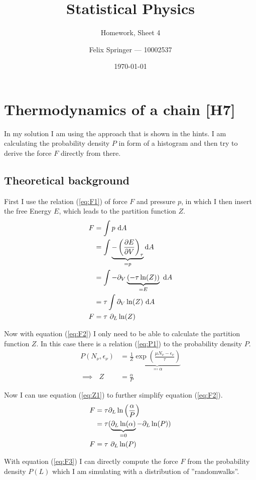 \documentclass[a4paper,12pt]{scrartcl}
\title{Statistical Physics}
\subtitle{Homework, Sheet 4}
\author{Felix Springer --- 10002537}
\date{\today}
\begin{document}
\maketitle

\section{Thermodynamics of a chain [H7]}
In my solution I am using the approach that is shown in the hints.
I am calculating the probability density $P$ in form of a histogram and then try to derive the force $F$ directly from there.

\subsection{Theoretical background}
First I use the relation (\ref{eq:F1}) of force $F$ and pressure $p$, in which I then insert the free Energy $E$, which leads to the partition function $Z$.
\begin{align}
	F &= \int p \text{ d}A \label{eq:F1} \\
	&= \int \underbrace{- \left( \frac{\partial E}{\partial V} \right)_{\tau}}_{= p} \text{d}A \notag \\
	&= \int - \partial_V \underbrace{(- \tau \ln(Z))}_{= E} \text{ d}A \notag \\
	&= \tau \int \partial_V \ln(Z) \text{ d}A \notag \\
	F &= \tau \text{ } \partial_L \ln(Z) \label{eq:F2}
\end{align}

Now with equation (\ref{eq:F2}) I only need to be able to calculate the partition function $Z$.
In this case there is a relation (\ref{eq:P1}) to the probability density $P$.
\begin{align}
	P (N_\nu, \epsilon_\nu) &= \frac{1}{Z} \underbrace{\exp \left( {\frac{\mu N_\nu - \epsilon_\nu}{\tau}} \right)}_{\eqqcolon \alpha} \label{eq:P1} \\
	\implies \text{ } Z &= \frac{\alpha}{P} \label{eq:Z1}
\end{align}

Now I can use equation (\ref{eq:Z1}) to further simplify equation (\ref{eq:F2}).
\begin{align}
	F &= \tau \partial_L \ln \left( \frac{\alpha}{P} \right) \notag \\
	&= \tau ( \underbrace{\partial_L \ln(\alpha)}_{= 0} - \partial_L \ln(P) ) \notag \\
	F &= \tau \text{ } \partial_L \ln(P) \label{eq:F3}
\end{align}

With equation (\ref{eq:F3}) I can directly compute the force $F$ from the probability density $P(L)$ which I am simulating with a distribution of ''randomwalks''.
\end{document}
